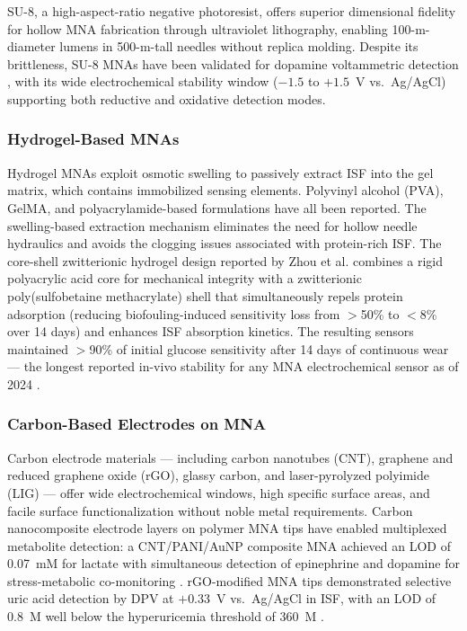 \documentclass[review,1p]{elsarticle}
\begin{document}
SU-8, a high-aspect-ratio negative photoresist, offers superior dimensional fidelity for hollow MNA fabrication through ultraviolet lithography, enabling 100-\textmu{}m-diameter lumens in 500-\textmu{}m-tall needles without replica molding. Despite its brittleness, SU-8 MNAs have been validated for dopamine voltammetric detection \cite{Rawson2021}, with its wide electrochemical stability window ($-1.5$ to $+1.5$~V vs.~Ag/AgCl) supporting both reductive and oxidative detection modes.

\subsubsection{Hydrogel-Based MNAs}

Hydrogel MNAs exploit osmotic swelling to passively extract ISF into the gel matrix, which contains immobilized sensing elements. Polyvinyl alcohol (PVA), GelMA, and polyacrylamide-based formulations have all been reported. The swelling-based extraction mechanism eliminates the need for hollow needle hydraulics and avoids the clogging issues associated with protein-rich ISF. The core-shell zwitterionic hydrogel design reported by Zhou et al. \cite{Zhou2024} combines a rigid polyacrylic acid core for mechanical integrity with a zwitterionic poly(sulfobetaine methacrylate) shell that simultaneously repels protein adsorption (reducing biofouling-induced sensitivity loss from $>$50\% to $<$8\% over 14 days) and enhances ISF absorption kinetics. The resulting sensors maintained $>$90\% of initial glucose sensitivity after 14 days of continuous wear — the longest reported in-vivo stability for any MNA electrochemical sensor as of 2024 \cite{Zhou2024}.

\subsubsection{Carbon-Based Electrodes on MNA}

Carbon electrode materials — including carbon nanotubes (CNT), graphene and reduced graphene oxide (rGO), glassy carbon, and laser-pyrolyzed polyimide (LIG) — offer wide electrochemical windows, high specific surface areas, and facile surface functionalization without noble metal requirements. Carbon nanocomposite electrode layers on polymer MNA tips have enabled multiplexed metabolite detection: a CNT/PANI/AuNP composite MNA achieved an LOD of 0.07~mM for lactate with simultaneous detection of epinephrine and dopamine for stress-metabolic co-monitoring \cite{Mugo2023Talanta}. rGO-modified MNA tips demonstrated selective uric acid detection by DPV at $+0.33$~V vs.~Ag/AgCl in ISF, with an LOD of 0.8~\textmu{}M well below the hyperuricemia threshold of 360~\textmu{}M \cite{Wang2023rGO}.
\end{document}
